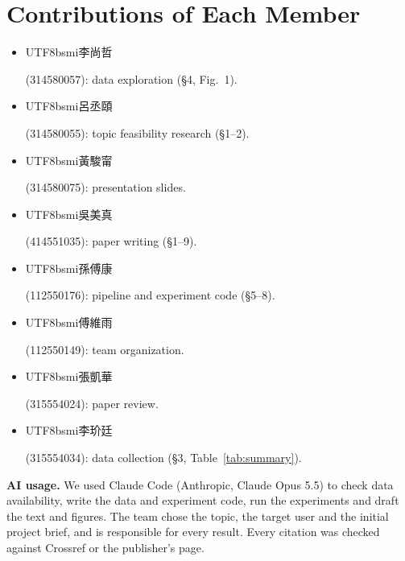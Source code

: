 \documentclass[11pt]{article}
\newcommand{\zh}[1]{\begin{CJK}{UTF8}{bsmi}#1\end{CJK}}
\begin{document}
\section*{Contributions of Each Member}
\begin{itemize}\setlength\itemsep{0pt}\setlength\topsep{0pt}\setlength\parskip{0pt}\small
\item \zh{李尚哲} (314580057): data exploration (\S4, Fig.~1).
\item \zh{呂丞頤} (314580055): topic feasibility research (\S1--2).
\item \zh{黃駿甯} (314580075): presentation slides.
\item \zh{吳美真} (414551035): paper writing (\S1--9).
\item \zh{孫傅康} (112550176): pipeline and experiment code (\S5--8).
\item \zh{傅維雨} (112550149): team organization.
\item \zh{張凱華} (315554024): paper review.
\item \zh{李玠廷} (315554034): data collection (\S3, Table~\ref{tab:summary}).
\end{itemize}
\textbf{AI usage.} We used Claude Code (Anthropic, Claude Opus 5.5) to check data availability, write the data and experiment code, run the experiments and draft the text and figures. The team chose the topic, the target user and the initial project brief, and is responsible for every result. Every citation was checked against Crossref or the publisher's page.


\end{document}
